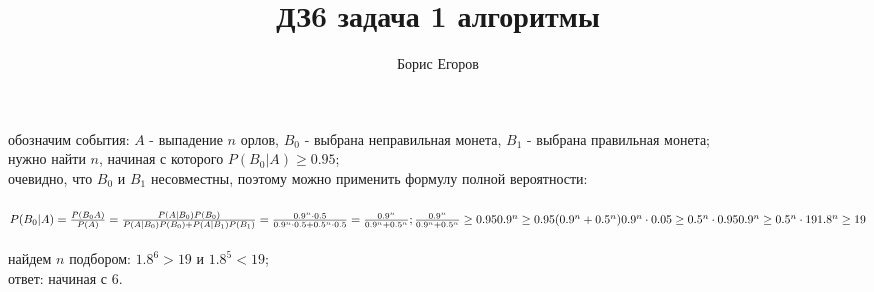 \documentclass[a4paper]{article}
\author{Борис Егоров}
\title{ДЗ6 задача 1 алгоритмы}
\begin{document}
	\maketitle
	\begin{large}
	обозначим события: $A$ - выпадение $n$ орлов, $B_0$ - выбрана неправильная монета, $B_1$ - выбрана правильная монета;\\
	нужно найти $n$, начиная с которого $P(B_0|A)\ge0.95$;\\
	очевидно, что $B_0$ и $B_1$ несовместны, поэтому можно применить формулу полной вероятности:\\\\
	$
	P(B_0|A)=\frac{P(B_0A)}{P(A)}=\frac{P(A|B_0)P(B_0)}{P(A|B_0)P(B_0)+P(A|B_1)P(B_1)}=\\\\
	\frac{0.9^n\cdot0.5}{0.9^n\cdot0.5+0.5^n\cdot0.5}=
	\frac{0.9^n}{0.9^n+0.5^n};\\\\
	\frac{0.9^n}{0.9^n+0.5^n}\ge0.95\\\\
	0.9^n\ge0.95(0.9^n+0.5^n)\\\\
	0.9^n\cdot0.05\ge0.5^n\cdot0.95\\\\
	0.9^n\ge0.5^n\cdot19\\\\
	1.8^n\ge19
	$\\\\
	найдем $n$ подбором: $1.8^6>19$ и $1.8^5<19$;\\
	ответ: начиная с 6.
	\end{large}
\end{document}
